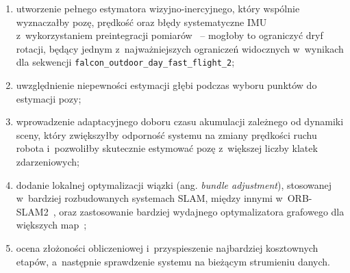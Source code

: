 \begin{enumerate}
    \item utworzenie pełnego estymatora wizyjno-inercyjnego, który wspólnie wyznaczałby pozę, prędkość oraz błędy systematyczne IMU z~wykorzystaniem preintegracji pomiarów~\cite{forster2015preintegration} -- mogłoby to ograniczyć dryf rotacji, będący jednym z~najważniejszych ograniczeń widocznych w~wynikach dla sekwencji \texttt{falcon\_outdoor\_day\_fast\_flight\_2};
    \item uwzględnienie niepewności estymacji głębi podczas wyboru punktów do estymacji pozy;
    \item wprowadzenie adaptacyjnego doboru czasu akumulacji zależnego od dynamiki sceny, który zwiększyłby odporność systemu na zmiany prędkości ruchu robota i~pozwoliłby skutecznie estymować pozę z~większej liczby klatek zdarzeniowych;
    \item dodanie lokalnej optymalizacji wiązki (ang. \textit{bundle adjustment}), stosowanej w~bardziej rozbudowanych systemach SLAM, między innymi w~ORB-SLAM2~\cite{murartal2017orbslam2}, oraz zastosowanie bardziej wydajnego optymalizatora grafowego dla większych map~\cite{grisetti2010graph};
    \item ocena złożoności obliczeniowej i~przyspieszenie najbardziej kosztownych etapów, a~następnie sprawdzenie systemu na bieżącym strumieniu danych.
\end{enumerate}
